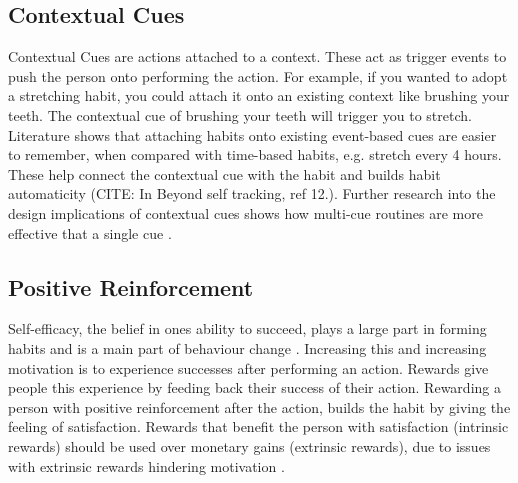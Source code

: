 \subsection*{Contextual Cues}
Contextual Cues are actions attached to a context. These act as trigger events to push the person onto performing the action. For example, if you wanted to adopt a stretching habit, you could attach it onto an existing context like brushing your teeth. The contextual cue of brushing your teeth will trigger you to stretch. Literature \cite{article_beyond_self_tracking_designing_apps} shows that attaching habits onto existing event-based cues are easier to remember, when compared with time-based habits, e.g. stretch every 4 hours. These help connect the contextual cue with the habit and builds habit automaticity (CITE: In Beyond self tracking, ref 12.). Further research into the design implications of contextual cues shows how multi-cue routines are more effective that a single cue \cite{article_understanding_use_contextual_cues_design_impl}.

\subsection*{Positive Reinforcement}
Self-efficacy, the belief in ones ability to succeed, plays a large part in forming habits and is a main part of behaviour change \cite{article_a_self_efficacy}. Increasing this and increasing motivation is to experience successes after performing an action. Rewards give people this experience by feeding back their success of their action.\newline
\newline
Rewarding a person with positive reinforcement after the action, builds the habit by giving the feeling of satisfaction. Rewards that benefit the person with satisfaction (intrinsic rewards) should be used over monetary gains (extrinsic rewards), due to issues with extrinsic rewards hindering motivation \cite{article_beyond_self_tracking_designing_apps}.

